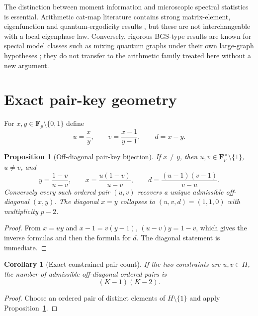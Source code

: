 \documentclass[11pt]{article}
\newtheorem{proposition}[theorem]{Proposition}
\newtheorem{corollary}[theorem]{Corollary}
\newcommand{\Fp}{\mathbf F_p}
\begin{document}
The distinction between moment information and microscopic spectral statistics
is essential.  Arithmetic cat-map literature contains strong matrix-element,
eigenfunction and quantum-ergodicity results
\cite{KR2005,KRR2007,DJ2024,KORS2025,BS2026}, but these are not interchangeable
with a local eigenphase law.  Conversely, rigorous BGS-type results are known
for special model classes such as mixing quantum graphs under their own
large-graph hypotheses \cite{PW2014,PW2015}; they do not transfer to the
arithmetic family treated here without a new argument.

\section{Exact pair-key geometry}

For $x,y\in\Fp\setminus\{0,1\}$ define
\begin{equation}\label{eq:keydef}
u=\frac{x}{y},\qquad
v=\frac{x-1}{y-1},\qquad d=x-y.
\end{equation}

\begin{proposition}[Off-diagonal pair-key bijection]\label{prop:key}
If $x\ne y$, then $u,v\in\Fp^\times\setminus\{1\}$, $u\ne v$, and
\begin{equation}\label{eq:inverse}
y=\frac{1-v}{u-v},\qquad
x=\frac{u(1-v)}{u-v},\qquad
d=\frac{(u-1)(v-1)}{v-u}.
\end{equation}
Conversely every such ordered pair $(u,v)$ recovers a unique admissible
off-diagonal $(x,y)$.  The diagonal $x=y$ collapses to $(u,v,d)=(1,1,0)$ with
multiplicity $p-2$.
\end{proposition}

\begin{proof}
From $x=uy$ and $x-1=v(y-1)$,
$(u-v)y=1-v$, which gives the inverse formulas and then the formula for $d$.
The diagonal statement is immediate.
\end{proof}

\begin{corollary}[Exact constrained-pair count]\label{cor:k2}
If the two constraints are $u,v\in H$, the number of admissible off-diagonal
ordered pairs is
\[
(K-1)(K-2).
\]
\end{corollary}

\begin{proof}
Choose an ordered pair of distinct elements of $H\setminus\{1\}$ and apply
Proposition~\ref{prop:key}.
\end{proof}
\end{document}

